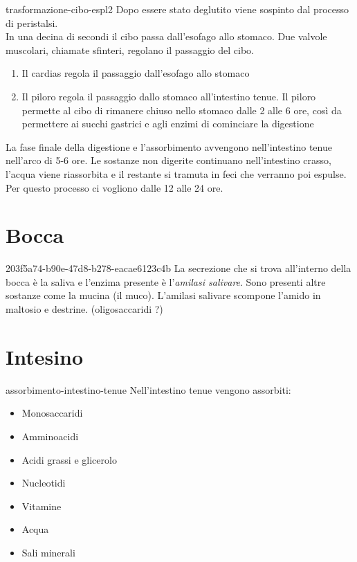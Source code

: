 \documentclass[preview]{standalone}
\begin{document}
\begin{snippet}{trasformazione-cibo-espl2}
    Dopo essere stato deglutito viene sospinto dal
    processo di peristalsi.
    \\
    In una decina di secondi il cibo passa dall'esofago allo stomaco. Due
    valvole muscolari, chiamate sfinteri, regolano il passaggio del cibo.
    
    \begin{enumerate}
        \item Il cardias regola il passaggio dall'esofago allo stomaco
        \item Il piloro regola il passaggio dallo stomaco all'intestino tenue.
        Il piloro permette al cibo di rimanere chiuso nello stomaco dalle
        2 alle 6 ore, così da permettere ai succhi gastrici e agli enzimi
        di cominciare la digestione
    \end{enumerate}
    
    La fase finale della digestione e l'assorbimento avvengono
    nell'intestino tenue nell'arco di 5-6 ore. Le sostanze non digerite
    continuano nell'intestino crasso, l'acqua viene riassorbita e il restante
    si tramuta in feci che verranno poi espulse. Per questo processo ci
    vogliono dalle 12 alle 24 ore.
\end{snippet}

\section{Bocca}

\begin{snippet}{203f5a74-b90e-47d8-b278-eacae6123c4b}
    La secrezione che si trova all'interno della bocca è la saliva e l'enzima
    presente è l'\textit{amilasi salivare}.
    Sono presenti altre sostanze come la mucina (il muco).
    L'amilasi salivare scompone l'amido in maltosio e destrine. (oligosaccaridi ?)
\end{snippet}


\section{Intesino}


\begin{snippet}{assorbimento-intestino-tenue}
    Nell'intestino tenue vengono assorbiti:
    \begin{itemize}
       \item Monosaccaridi
       \item Amminoacidi
       \item Acidi grassi e glicerolo
       \item Nucleotidi
       \item Vitamine
       \item Acqua
       \item Sali minerali
    \end{itemize}
\end{snippet}
\end{document}

